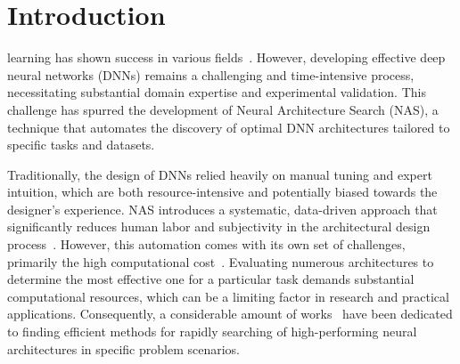 \documentclass[../main.tex]{subfiles}
\begin{document}
\section{Introduction}

 learning has shown success in various fields~\cite{DBLP:conf/cvpr/HeZRS16,DBLP:conf/cvpr/RedmonDGF16,DBLP:conf/acl/FosterVUMKFJSWB18}.
However, developing effective deep neural networks (DNNs) remains a challenging and time-intensive process, necessitating substantial domain expertise and experimental validation.
This challenge has spurred the development of Neural Architecture Search (NAS), a technique that automates the discovery of optimal DNN architectures tailored to specific tasks and datasets.

Traditionally, the design of DNNs relied heavily on manual tuning and expert intuition, which are both resource-intensive and potentially biased towards the designer's experience.
NAS introduces a systematic, data-driven approach that significantly reduces human labor and subjectivity in the architectural design process~\cite{DBLP:conf/iclr/ZophL17,DBLP:conf/cvpr/ZophVSL18}.
However, this automation comes with its own set of challenges, primarily the high computational cost~\cite{pham_efficient_2018}.  Evaluating numerous architectures to determine the most effective one for a particular task demands substantial computational resources, which can be a limiting factor in research and practical applications.
Consequently, a considerable amount of works~\cite{pham_efficient_2018,DBLP:conf/iclr/LiuSY19,DBLP:journals/tnn/DongHFTTO23,DBLP:conf/iclr/BakerGRN18,DBLP:conf/iconip/HouDFQ21} have been dedicated to finding efficient methods for rapidly searching of high-performing neural architectures in specific problem scenarios.
\end{document}
